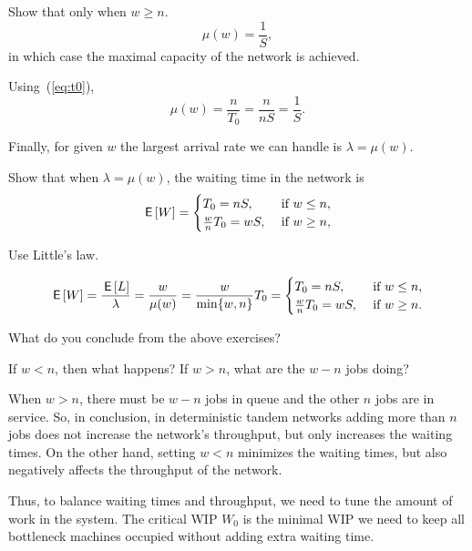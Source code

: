 \begin{exercise}
Show that  only when $w\geq n$.
\begin{equation*}
\mu(w) = \frac 1S,
\end{equation*}
in which case the maximal capacity of the network is achieved.
\begin{solution}
Using~(\ref{eq:t0}), 
\begin{equation*}
  \mu(w) = \frac{n}{T_0} = \frac{n}{n S} = \frac 1S.
\end{equation*}
\end{solution}
\end{exercise}

Finally, for given $w$  the largest arrival rate we can handle is 
$\lambda = \mu(w)$. 

\begin{exercise}
  Show that when $\lambda=\mu(w)$,  the waiting time in the network is 
\begin{equation*}
  \,\mathsf{E}\left[W\right] = 
\begin{cases}
  T_0=n S, & \text{ if } w\leq n, \\
  \frac{w}{n} T_0 = w S, & \text{ if } w\geq n,
\end{cases}
\end{equation*}
\begin{hint}
  Use Little's law.
\end{hint}
  \begin{solution}
\begin{equation*}
  \begin{split}
  \,\mathsf{E}\left[W\right] 
= \frac{\,\mathsf{E}\left[L\right]}{\lambda} = \frac{w}{\mu(w)} = \frac{w}{\min\{w, n\}} T_0 
=
\begin{cases}
  T_0=n S, & \text{ if } w\leq n, \\
  \frac{w}{n} T_0 = w S, & \text{ if } w\geq n.
\end{cases}
  \end{split}
\end{equation*}
  \end{solution}
\end{exercise}

\begin{exercise}
  What do you conclude from the above exercises?
  \begin{hint}
   If $w<n$, then what happens? If $w>n$, what are the $w-n$ jobs doing?
  \end{hint}
  \begin{solution}
When $w>n$, there must be $w-n$ jobs in queue and the
other $n$ jobs are in service. So, in conclusion, in deterministic
tandem networks adding more than $n$ jobs does not increase the
network's throughput, but only increases the waiting times. On the other
hand, setting $w<n$ minimizes the waiting times, but also negatively
affects the throughput of the network. 

Thus, to balance waiting times and throughput, we need to tune the amount of work in the system. The critical WIP $W_0$ is the minimal WIP we need to keep all bottleneck machines occupied without adding extra waiting time.
  \end{solution}
\end{exercise}

